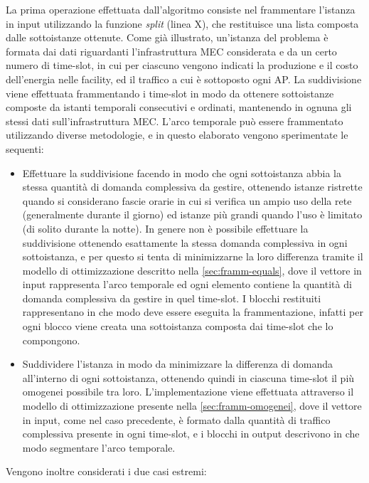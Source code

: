 La prima operazione effettuata dall'algoritmo consiste nel frammentare l'istanza in input utilizzando la funzione \textit{split} (linea X), che restituisce una lista composta dalle sottoistanze ottenute. Come già illustrato, un'istanza del problema è formata dai dati riguardanti l'infrastruttura MEC considerata e da un certo numero di time-slot, in cui per ciascuno vengono indicati la produzione e il costo dell'energia nelle facility, ed il traffico a cui è sottoposto ogni AP. La suddivisione viene effettuata frammentando i time-slot in modo da ottenere sottoistanze composte da istanti temporali consecutivi e ordinati, mantenendo in ognuna gli stessi dati sull'infrastruttura MEC. L'arco temporale può essere frammentato utilizzando diverse metodologie, e in questo elaborato vengono sperimentate le sequenti:
\begin{itemize}
    \item Effettuare la suddivisione facendo in modo che ogni sottoistanza abbia la stessa quantità di domanda complessiva da gestire, ottenendo istanze ristrette quando si considerano fascie orarie in cui si verifica un ampio uso della rete (generalmente durante il giorno) ed istanze più grandi quando l'uso è limitato (di solito durante la notte). In genere non è possibile effettuare la suddivisione ottenendo esattamente la stessa domanda complessiva in ogni sottoistanza, e per questo si tenta di minimizzarne la loro differenza tramite il modello di ottimizzazione descritto nella \autoref{sec:framm-equals}, dove il vettore in input rappresenta l'arco temporale ed ogni elemento contiene la quantità di domanda complessiva da gestire in quel time-slot. I blocchi restituiti rappresentano in che modo deve essere eseguita la frammentazione, infatti per ogni blocco viene creata una sottoistanza composta dai time-slot che lo compongono.

    \item Suddividere l'istanza in modo da minimizzare la differenza di domanda all'interno di ogni sottoistanza, ottenendo quindi in ciascuna time-slot il più omogenei possibile tra loro. L'implementazione viene effettuata attraverso il modello di ottimizzazione presente nella \autoref{sec:framm-omogenei}, dove il vettore in input, come nel caso precedente, è formato dalla quantità di traffico complessiva presente in ogni time-slot, e i blocchi in output descrivono in che modo segmentare l'arco temporale.

\end{itemize}
Vengono inoltre considerati i due casi estremi:

